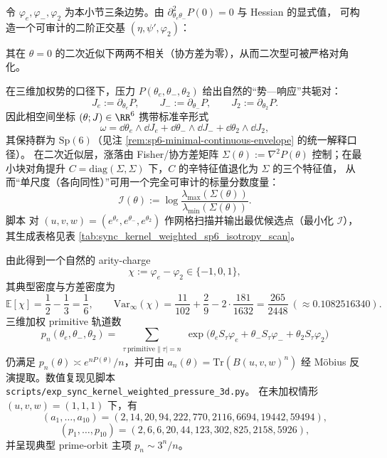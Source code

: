\begin{corollary}\label{cor:sync-kernel-3d-orthobasis}
令 \(\varphi_e,\varphi_-,\varphi_2\) 为本小节三条边势。由 \(\partial^2_{\theta_e\theta_-}P(0)=0\) 与 Hessian 的显式值，
可构造一个可审计的二阶正交基 \((\eta,\psi',\varphi_2)\)：

其在 \(\theta=0\) 的二次近似下两两不相关（协方差为零），从而二次型可被严格对角化。
\end{corollary}

\begin{remark}\label{rem:sync-kernel-3d-sp6-isotropy-scan}
在三维加权势的口径下，压力 \(P(\theta_e,\theta_-,\theta_2)\) 给出自然的“势—响应”共轭对：
\[
J_e:=\partial_{\theta_e}P,\qquad
J_-:=\partial_{\theta_-}P,\qquad
J_2:=\partial_{\theta_2}P.
\]
因此相空间坐标 \((\theta;J)\in\RR^6\) 携带标准辛形式
\[
\omega=\dd\theta_e\wedge \dd J_e+\dd\theta_-\wedge \dd J_-+\dd\theta_2\wedge \dd J_2,
\]
其保持群为 \(\mathrm{Sp}(6)\)（见注 \ref{rem:sp6-minimal-continuous-envelope} 的统一解释口径）。
在二次近似层，涨落由 Fisher/协方差矩阵
\(
\Sigma(\theta):=\nabla^2P(\theta)
\)
控制；在最小块对角提升 \(C=\mathrm{diag}(\Sigma,\Sigma)\) 下，\(C\) 的辛特征值退化为 \(\Sigma\) 的三个特征值，
从而“单尺度（各向同性）”可用一个完全可审计的标量分数度量：
\[
\mathcal{I}(\theta):=\log\frac{\lambda_{\max}(\Sigma(\theta))}{\lambda_{\min}(\Sigma(\theta))}.
\]
脚本 \texttt{} 对 \((u,v,w)=(e^{\theta_e},e^{\theta_-},e^{\theta_2})\) 作网格扫描并输出最优候选点（最小化 \(\mathcal{I}\)），其生成表格见表 \ref{tab:sync_kernel_weighted_sp6_isotropy_scan}。
\end{remark}


由此得到一个自然的 arity-charge
\[
\chi:=\varphi_e-\varphi_2\in\{-1,0,1\},
\]
其典型密度与方差密度为
\[
\mathbb{E}[\chi]=\frac12-\frac13=\frac16,\qquad
\mathrm{Var}_\infty(\chi)=\frac{11}{102}+\frac{2}{9}-2\cdot\frac{181}{1632}=\frac{265}{2448}\ (\approx 0.1082516340).
\]
三维加权 primitive 轨道数
\[
p_n(\theta_e,\theta_-,\theta_2)=\sum_{\substack{\tau\ \mathrm{primitive}\|\tau|=n}}
\exp\!\bigl(\theta_e S_\tau\varphi_e+\theta_-S_\tau\varphi_-+\theta_2S_\tau\varphi_2\bigr)
\]
仍满足 $p_n(\theta)\asymp e^{nP(\theta)}/n$，并可由
$a_n(\theta)=\mathrm{Tr}(B(u,v,w)^n)$ 经 Möbius 反演提取。数值复现见脚本 \texttt{scripts/exp\_sync\_kernel\_weighted\_pressure\_3d.py}。
在未加权情形 $(u,v,w)=(1,1,1)$ 下，有
\[
(a_1,\dots,a_{10})=(2,14,20,94,222,770,2116,6694,19442,59494),
\]
\[
(p_1,\dots,p_{10})=(2,6,6,20,44,123,302,825,2158,5926),
\]
并呈现典型 prime-orbit 主项 $p_n\sim 3^n/n$。


